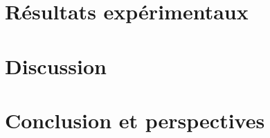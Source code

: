 \documentclass[a4paper,12pt]{report}
\begin{document}
\chapter{Résultats expérimentaux}



\chapter{Discussion}



\chapter{Conclusion et perspectives}






\nocite{*}

\end{document}
